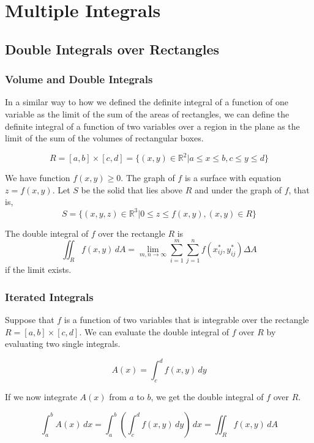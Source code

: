 \chapter{Multiple Integrals}

\section{Double Integrals over Rectangles}

\subsection{Volume and Double Integrals}

In a similar way to how we defined the definite integral of a function of one variable as the limit of the sum of the areas of rectangles, we can define the definite integral of a function of two variables over a region in the plane as the limit of the sum of the volumes of rectangular boxes.

\[
  R = [a, b] \times [c, d] = \{(x, y) \in \mathbb{R}^2 | a \le x \le b, c \le y \le d\}
\]

We have function $f(x, y) \ge 0$. The graph of $f$ is a surface with equation $z = f(x, y)$. Let $S$ be the solid that lies above $R$ and under the graph of $f$, that is,
\[
  S = \{(x, y, z) \in \mathbb{R}^3 | 0 \le z \le f(x, y), (x, y) \in R\}
\]

\begin{definition}
  The double integral of \(f\) over the rectangle \(R\) is
  \[
    \iint_R f(x, y) \, dA = \lim_{m, n \to \infty} \sum_{i=1}^{m} \sum_{j=1}^{n} f(x_{ij}^*, y_{ij}^*) \Delta A
  \]
  if the limit exists.
\end{definition}

\subsection{Iterated Integrals}

Suppose that \(f\) is a function of two variables that is integrable over the rectangle \(R = [a, b] \times [c, d]\). We can evaluate the double integral of \(f\) over \(R\) by evaluating two single integrals.

\[
  A(x) = \int_c^d f(x, y) \, dy
\]

If we now integrate \(A(x)\) from \(a\) to \(b\), we get the double integral of \(f\) over \(R\).

\[
  \int_a^b A(x) \, dx = \int_a^b \left( \int_c^d f(x, y) \, dy \right) \, dx = \iint_R f(x, y) \, dA
\]

